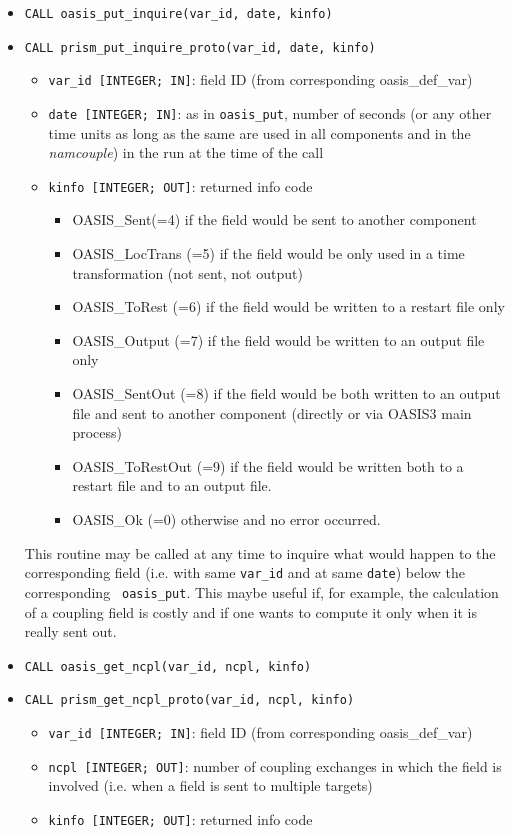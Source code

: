 \begin{itemize}
\item {\tt CALL oasis\_put\_inquire(var\_id, date, kinfo)}
\item {\tt CALL prism\_put\_inquire\_proto(var\_id, date, kinfo)}
  \begin{itemize}
  \item {\tt var\_id [INTEGER; IN]}: field ID (from
  corresponding oasis\_def\_var)
  \item {\tt date [INTEGER; IN]}: as in {\tt oasis\_put}, number of seconds (or any other time
    units as long as the same are used in all components and in the {\it
      namcouple}) in the run at the time of the call
  \item {\tt kinfo [INTEGER; OUT]}: returned info code
    \begin{itemize}
    \item OASIS\_Sent(=4) if the field would be sent to another component
    \item OASIS\_LocTrans (=5) if the field would be only used in a time
      transformation (not sent, not output)
    \item OASIS\_ToRest (=6) if the field would be written to a restart
      file only
    \item OASIS\_Output (=7) if the field would be written to an output
      file only
    \item OASIS\_SentOut (=8) if the field would be both written to an
      output file and sent to another component (directly or via OASIS3
      main process)
    \item OASIS\_ToRestOut (=9) if the field would be written both to a
      restart file and to an output file.
    \item OASIS\_Ok (=0) otherwise and no error occurred.
    \end{itemize}
  \end{itemize}

This routine may be called at any time to
inquire what would happen to the corresponding field (i.e. with same
{\tt var\_id} and at same {\tt date}) below the corresponding {\tt
  oasis\_put}. This maybe useful if, for example, the calculation of
a coupling field is costly and if one wants to compute it only when it is
really sent out.

\item {\tt CALL oasis\_get\_ncpl(var\_id, ncpl, kinfo)}
\item {\tt CALL prism\_get\_ncpl\_proto(var\_id, ncpl, kinfo)}
  \begin{itemize}
  \item {\tt var\_id [INTEGER; IN]}: field ID (from
  corresponding oasis\_def\_var)
  \item {\tt ncpl [INTEGER; OUT]}: number of coupling exchanges in which the field
  is involved (i.e. when a field is sent to multiple targets) 
  \item {\tt kinfo [INTEGER; OUT]}: returned info code
  \end{itemize}


\end{itemize}
